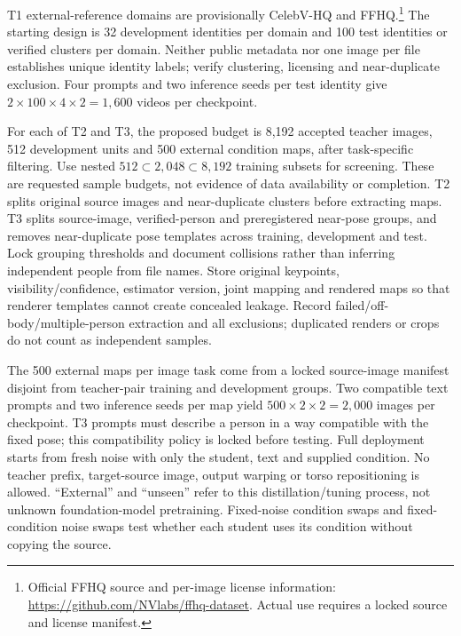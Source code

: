 \documentclass[11pt]{article}
\begin{document}
T1 external-reference domains are provisionally CelebV-HQ \cite{celebvhq} and FFHQ.\footnote{Official FFHQ source and per-image license information: \url{https://github.com/NVlabs/ffhq-dataset}. Actual use requires a locked source and license manifest.} The starting design is 32 development identities per domain and 100 test identities or verified clusters per domain. Neither public metadata nor one image per file establishes unique identity labels; verify clustering, licensing and near-duplicate exclusion. Four prompts and two inference seeds per test identity give $2\times100\times4\times2=1{,}600$ videos per checkpoint.

For each of T2 and T3, the proposed budget is 8,192 accepted teacher images, 512 development units and 500 external condition maps, after task-specific filtering. Use nested $512\subset2{,}048\subset8{,}192$ training subsets for screening. These are requested sample budgets, not evidence of data availability or completion. T2 splits original source images and near-duplicate clusters before extracting maps. T3 splits source-image, verified-person and preregistered near-pose groups, and removes near-duplicate pose templates across training, development and test. Lock grouping thresholds and document collisions rather than inferring independent people from file names. Store original keypoints, visibility/confidence, estimator version, joint mapping and rendered maps so that renderer templates cannot create concealed leakage. Record failed/off-body/multiple-person extraction and all exclusions; duplicated renders or crops do not count as independent samples.

The 500 external maps per image task come from a locked source-image manifest disjoint from teacher-pair training and development groups. Two compatible text prompts and two inference seeds per map yield $500\times2\times2=2{,}000$ images per checkpoint. T3 prompts must describe a person in a way compatible with the fixed pose; this compatibility policy is locked before testing. Full deployment starts from fresh noise with only the student, text and supplied condition. No teacher prefix, target-source image, output warping or torso repositioning is allowed. ``External'' and ``unseen'' refer to this distillation/tuning process, not unknown foundation-model pretraining. Fixed-noise condition swaps and fixed-condition noise swaps test whether each student uses its condition without copying the source.
\end{document}
